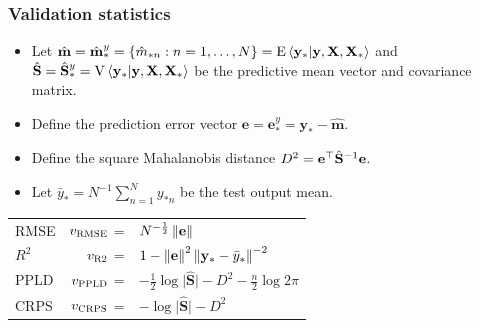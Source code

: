 \documentclass{snedecorbeamer}
\begin{document}
\begin{frame}%
  \label{frm:validation}
  \frametitle{Validation statistics}

  \newcommand{\predmean}{\hat{\mathbf{m}}^{y}_*}
  \newcommand{\predvar}{\hat{\mathbf{S}}^{y}_*}
  \newcommand{\postpred}{\hat{p}^{y}_*}

  \begin{itemize}
  \item   Let
    $\hat{\mathbf{m}} = \predmean = \{\hat{m}_{*n}: n = 1, \dots, N\} =
    \EV{\mathbf{y}_* | \mathbf{y}, \mathbf{X}, \mathbf{X}_*}$
    and
    $\hat{\mathbf{S}} = \predvar = \VV{\mathbf{y}_* |
      \mathbf{y}, \mathbf{X}, \mathbf{X}_*}$
    be the predictive mean vector and covariance matrix.
  \item  Define the
    prediction error vector $\mathbf{e} = \mathbf{e}_{*}^{y} =
    \mathbf{y}_{*} - \hat{\mathbf{m}}$.
  \item Define the square Mahalanobis distance $D^2
    = \mathbf{e}^{\top} \hat{\mathbf{S}}^{-1} \mathbf{e}$.
  \item   Let $\bar{y}_* = N^{-1} \sum_{n=1}^{N} y_{*n}$ be the test output
    mean.
  \end{itemize}

  \begin{center}
    \begin{tabular}{lrl}
      RMSE
      & $v_{\textsc{RMSE}}$ =
      & $N^{-\frac{1}{2}} \left\lVert\mathbf{e}\right\rVert$ \\
      $R^2$
      & $v_{\textsc{R2}} $ =
      & $1 -%
        \norm{\mathbf{e}}^{2}
        \norm{\mathbf{y}_* - \bar{y}_*}^{-2}$ \\
      PPLD
      & $v_{\textsc{PPLD}}$ =
      & $
        -\frac{1}{2} \log \lvert \hat{\mathbf{S}} \rvert
        -D^2
        -\frac{n}{2} \log 2 \pi
        $
      \\
      CRPS
      & $v_{\textsc{CRPS}}$ =
      & $
        -\log \lvert \hat{\mathbf{S}} \rvert%
        -D^2
        $
    \end{tabular}
  \end{center}
\end{frame}
\end{document}
